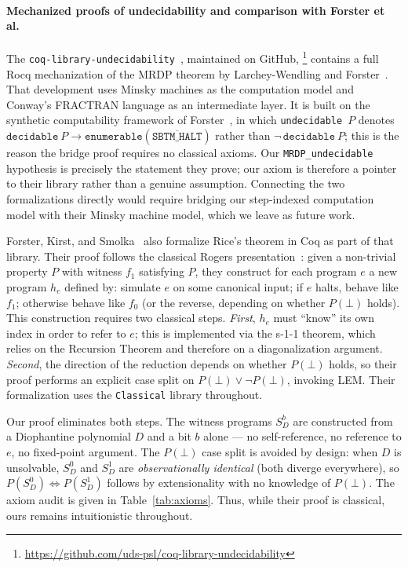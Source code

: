 \documentclass{lmcs}
\begin{document}
\paragraph{Mechanized proofs of undecidability and comparison with Forster et al.}
The \texttt{coq-library-undecidability}~\cite{forster2019,larchey2022},
maintained on GitHub,%
\footnote{\url{https://github.com/uds-psl/coq-library-undecidability}}
contains a full Rocq mechanization of the MRDP theorem by Larchey-Wendling
and Forster~\cite{larchey2022}. That development uses Minsky machines as
the computation model and Conway's FRACTRAN language as an intermediate
layer. It is built on the synthetic computability framework of
Forster~\cite{forster2022synthetic}, in which \texttt{undecidable}~$P$
denotes $\mathtt{decidable}~P \to \mathtt{enumerable}(\overline{\mathtt{SBTM\_HALT}})$
rather than $\neg\,\mathtt{decidable}~P$; this is the reason the bridge proof
requires no classical axioms.
Our \texttt{MRDP\_undecidable} hypothesis is precisely the
statement they prove; our axiom is therefore a pointer to their library
rather than a genuine assumption. Connecting the two formalizations
directly would require bridging our step-indexed computation model with
their Minsky machine model, which we leave as future work.

Forster, Kirst, and Smolka~\cite{forster2019} also formalize Rice's
theorem in Coq as part of that library. Their proof follows
the classical Rogers presentation~\cite{rogers1967}: given a non-trivial
property $P$ with witness $f_1$ satisfying $P$, they construct for each
program $e$ a new program $h_e$ defined by: simulate $e$ on some canonical
input; if $e$ halts, behave like $f_1$; otherwise behave like $f_0$
(or the reverse, depending on whether $P(\bot)$ holds). This construction
requires two classical steps. \emph{First}, $h_e$ must ``know'' its own
index in order to refer to $e$; this is implemented via the s-1-1 theorem,
which relies on the Recursion Theorem and therefore on a diagonalization
argument. \emph{Second}, the direction of the reduction depends on whether
$P(\bot)$ holds, so their proof performs an explicit case split on
$P(\bot) \vee \neg P(\bot)$, invoking LEM. Their formalization uses the
\texttt{Classical} library throughout.

Our proof eliminates both steps. The witness programs $S_D^b$ are constructed
from a Diophantine polynomial $D$ and a bit $b$ alone --- no self-reference,
no reference to $e$, no fixed-point argument. The $P(\bot)$ case split
is avoided by design: when $D$ is unsolvable, $S_D^0$ and $S_D^1$ are
\emph{observationally identical} (both diverge everywhere), so
$P(S_D^0) \Leftrightarrow P(S_D^1)$ follows by extensionality with no
knowledge of $P(\bot)$. The axiom audit is given in Table~\ref{tab:axioms}.
Thus, while their proof is classical, ours remains intuitionistic throughout.
\end{document}
